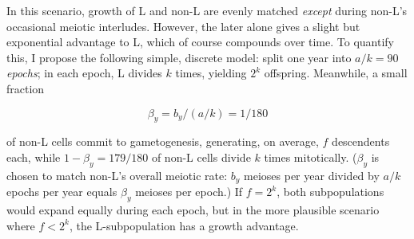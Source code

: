 \documentclass{article}\usepackage[]{graphicx}\usepackage[]{color}
\begin{document}
In this scenario, growth of L and non-L are evenly matched \textit{except} during non-L's occasional
meiotic interludes.  However, the later alone gives a slight but exponential advantage to L, which
of course compounds over time.  To quantify this, I propose the following simple, discrete model:
split one year into $a/k=90$ \textit{epochs}; in each epoch, L divides $k$ times, yielding $2^k$
offspring.  Meanwhile, a small fraction

  $$\beta_y=b_y/(a/k)=1/180$$

\noindent of non-L cells commit to gametogenesis, generating, on average, $f$ descendents each,
while $1-\beta_y=179/180$ of non-L cells divide $k$ times mitotically.  ($\beta_y$ is chosen to
match non-L's overall meiotic rate: $b_y$ meioses per year divided by $a/k$ epochs per year equals
$\beta_y$ meioses per epoch.)  If $f=2^k$, both subpopulations would expand equally during each
epoch, but in the more plausible scenario where $f < 2^k$, the L-subpopulation has a growth
advantage.
\end{document}
